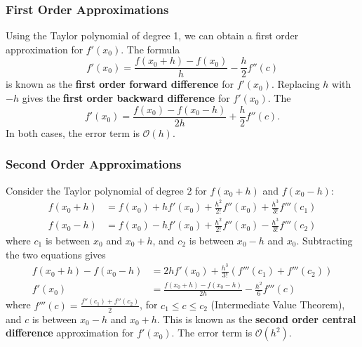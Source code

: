 \documentclass{article}
\begin{document}
\subsubsection{First Order Approximations}
Using the Taylor polynomial of degree 1, we can obtain a first order approximation for \(f'\left( x_0 \right)\).
The formula
\begin{equation*}
    f'\left( x_0 \right) = \frac{f\left( x_0 + h \right) - f\left( x_0 \right)}{h} - \frac{h}{2} f''\left( c \right)
\end{equation*}
is known as the \textbf{first order forward difference} for \(f'\left( x_0 \right)\). Replacing
\(h\) with \(-h\) gives the \textbf{first order backward difference} for \(f'\left( x_0 \right)\). The
\begin{equation*}
    f'\left( x_0 \right) = \frac{f\left( x_0 \right) - f\left( x_0 - h \right)}{2h} + \frac{h}{2} f''\left( c \right).
\end{equation*}
In both cases, the error term is \(\mathcal{O}\left( h \right)\).
\subsubsection{Second Order Approximations}
Consider the Taylor polynomial of degree 2 for \(f\left( x_0 + h \right)\) and \(f\left( x_0 - h \right)\):
\begin{align*}
    f\left( x_0 + h \right) & = f\left( x_0 \right) + h f'\left( x_0 \right) + \frac{h^2}{2!} f''\left( x_0 \right) + \frac{h^3}{3!} f'''\left( c_1 \right) \\
    f\left( x_0 - h \right) & = f\left( x_0 \right) - h f'\left( x_0 \right) + \frac{h^2}{2!} f''\left( x_0 \right) - \frac{h^3}{3!} f'''\left( c_2 \right)
\end{align*}
where \(c_1\) is between \(x_0\) and \(x_0 + h\), and \(c_2\) is between \(x_0 - h\) and \(x_0\).
Subtracting the two equations gives
\begin{align*}
    f\left( x_0 + h \right) - f\left( x_0 - h \right) & = 2h f'\left( x_0 \right) + \frac{h^3}{3!} \left( f'''\left( c_1 \right) + f'''\left( c_2 \right) \right) \\
    f'\left( x_0 \right)                              & = \frac{f\left( x_0 + h \right) - f\left( x_0 - h \right)}{2h} - \frac{h^2}{6} f'''\left( c \right)
\end{align*}
where \(f'''\left( c \right) = \frac{f''\left( c_1 \right) + f''\left( c_2 \right)}{2}\), for \(c_1 \leq c \leq c_2\) (Intermediate Value Theorem),
and \(c\) is between \(x_0 - h\) and \(x_0 + h\).
This is known as the \textbf{second order central difference} approximation for \(f'\left( x_0 \right)\). The error term is \(\mathcal{O}\left( h^2 \right)\).
\end{document}
